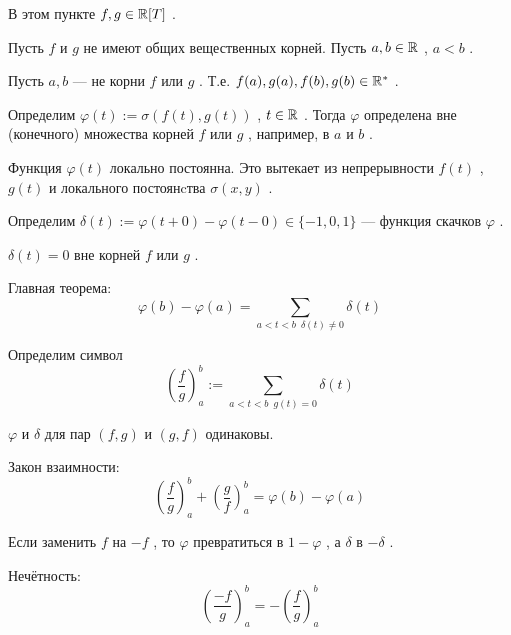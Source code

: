 \SSbullet

В этом пункте \( f,g \in \mathbb{R}[T] \) .

\SSsect Пусть \( f \) и \( g \) не имеют общих вещественных корней. 
Пусть \( a,b \in \mathbb{R} \) , \( a < b \) .

\SSsect Пусть \( a,b \) --- не корни \( f \) или \( g \) .
Т.е. \( f(a),g(a),f(b),g(b) \in \mathbb{R}^* \) .

\SSsect[def] Определим \( \varphi(t) := \sigma(f(t),g(t)) \) , \( t \in \mathbb{R} \) .
Тогда \( \varphi \) определена вне (конечного) множества корней \( f \) или \( g \) ,
например, в \( a \) и \( b \) .

\SSsect Функция \( \varphi(t) \) локально постоянна. Это вытекает из непрерывности \( f(t) \) ,
\( g(t) \) и локального постоянcтва \( \sigma(x,y) \) .

\vspace
{}


\SSsect[def] Определим \( \delta(t) := \varphi(t+0) - \varphi(t-0) \in \{-1,0,1\} \) --- 
функция скачков \( \varphi \) .

\SSsect \( \delta(t) = 0 \) вне корней \( f \) или \( g \) .

\SSsect[!!] Главная теорема:
\[ \varphi(b) - \varphi(a) = \sum_{ a<t<b \enspace \delta(t) \neq 0 } \delta(t) \]

\def\Symbol#1#2{ \left( \frac{#1}{#2} \right)^b_a }

\SSsect[def] Определим символ
\[ \Symbol{f}{g} := \sum_{ a<t<b \enspace g(t)=0 } \delta(t) \]

\SSsect \( \varphi \) и \( \delta \) для пар \( (f,g) \) и \( (g,f) \) одинаковы.

\SSsect[!!] Закон взаимности:
\[ \Symbol{f}{g} + \Symbol{g}{f} = \varphi(b)-\varphi(a) \]

\SSsect Если заменить \( f \) на \( -f \) , то \( \varphi \) превратиться в \( 1-\varphi \) , а \( \delta \) в \( -\delta \) .

\SSsect[!] Нечётность:
\[ \Symbol{-f}{g} = - \Symbol{f}{g} \]

